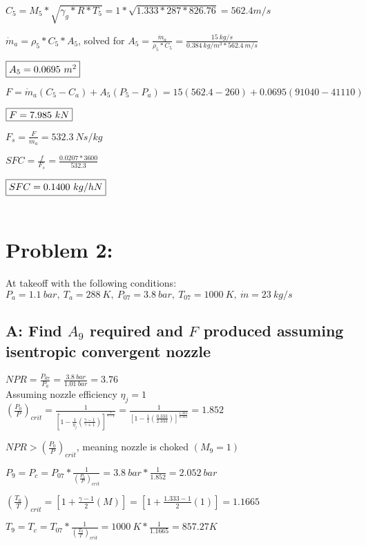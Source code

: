 \documentclass{article}
\begin{document}
$C_5=M_5*\sqrt{\gamma_g*R*T_5}=1*\sqrt{1.333*287*826.76}=562.4 m/s$

$\dot{m}_a=\rho_5*C_5*A_5$, solved for $A_5=\frac{\dot{m}_a}{\rho_5*C_5}=\frac{15\ kg/s}{0.384\ kg/m^3*562.4\ m/s}$

$\fbox{$A_5=0.0695\ m^2$}$

$F=\dot{m}_a(C_5-C_a)+A_5(P_5-P_a)=15(562.4-260)+0.0695(91040-41110)$

$\fbox{$F=7.985\ kN$}$

$F_s=\frac{F}{\dot{m}_a}=532.3\ Ns/kg$

$SFC=\frac{f}{F_s}=\frac{0.0207*3600}{532.3}$

$\fbox{$SFC=0.1400\ kg/hN$}$
\\
\\


\section*{Problem 2:}


At takeoff with the following conditions:
\\

$P_a=1.1\ bar,\ T_a=288\ K,\ P_{07}=3.8\ bar,\ T_{07}=1000\ K,\ \dot{m}=23\ kg/s$
\\

\subsection*{A: Find $A_9$ required and $F$ produced assuming isentropic convergent nozzle}


$NPR=\frac{P_{07}}{P_a}=\frac{3.8\ bar}{1.01\ bar}=3.76$
\\

Assuming nozzle efficiency $\eta_j=1$
\\

$(\frac{P_0}{P})_{crit}=\frac{1}{[1-\frac{1}{\eta_j}(\frac{\gamma-1}{\gamma+1})]^{\frac{\gamma}{\gamma-1}}}
=\frac{1}{[1-\frac{1}{1}(\frac{0.333}{2.333})]^{\frac{1.333}{0.333}}}=1.852$

$NPR>(\frac{P_0}{P})_{crit}$, meaning nozzle is choked $(M_9=1)$

$P_9=P_c=P_{07}*\frac{1}{(\frac{P_0}{P})_{crit}}=3.8\ bar*\frac{1}{1.852}=2.052\ bar$

$(\frac{T_0}{T})_{crit}=[1+\frac{\gamma-1}{2}(M)]=[1+\frac{1.333-1}{2}(1)]=1.1665$

$T_9=T_c=T_{07}*\frac{1}{(\frac{T_0}{T})_{crit}}=1000\ K*\frac{1}{1.1665}=857.27K$
\end{document}
